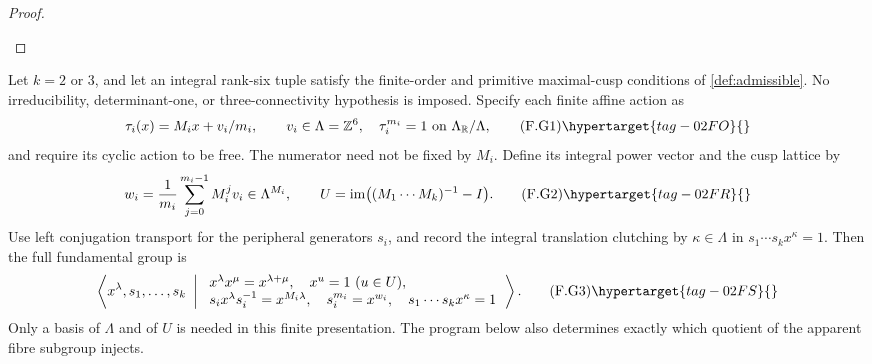 \begin{proof}
\begin{enumerate}[label={$\langle1\rangle$\arabic*.}]
\end{enumerate}
\end{proof}




\begin{theorem}\hypertarget{tag-02NM}{}\label{maps:src:F.2.31}


Let $k=2$ or $3$, and let an integral rank-six tuple satisfy the
finite-order and primitive maximal-cusp conditions of \cref{def:admissible}.  No
irreducibility, determinant-one, or three-connectivity hypothesis is
imposed.  Specify each finite affine action as
\[
 \tau_i(x)=M_ix+v_i/m_i,\qquad v_i\in\Lambda=\mathbb Z^6,
 \quad \tau_i^{m_i}=1\text{ on }\Lambda_{\mathbb R}/\Lambda,
 \tag{F.G1}\hypertarget{tag-02FO}{}\label{maps:eq:F.G1}
\]
and require its cyclic action to be free.  The numerator need not be
fixed by $M_i$.  Define its integral power vector and the cusp
lattice by
\[
 w_i=\frac1{m_i}\sum_{j=0}^{m_i-1}M_i^jv_i\in\Lambda^{M_i},
 \qquad U=\operatorname{im}\bigl((M_1\cdots M_k)^{-1}-I\bigr).
 \tag{F.G2}\hypertarget{tag-02FR}{}\label{maps:eq:F.G2}
\]
Use left conjugation transport for the peripheral generators $s_i$,
and record the integral translation clutching by $\kappa\in\Lambda$
in $s_1\cdots s_kx^\kappa=1$.  Then the full fundamental group is
\[
 \left\langle x^\lambda,s_1,\ldots,s_k\ \left|\
 \begin{array}{l}
 x^\lambda x^\mu=x^{\lambda+\mu},\quad x^u=1\ (u\in U),\\
 s_ix^\lambda s_i^{-1}=x^{M_i\lambda},\quad
 s_i^{m_i}=x^{w_i},\quad s_1\cdots s_kx^\kappa=1
 \end{array}\right.\right\rangle .                         \tag{F.G3}\hypertarget{tag-02FS}{}\label{maps:eq:F.G3}
\]
Only a basis of $\Lambda$ and of $U$ is needed in this finite
presentation.  The program below also determines exactly which
quotient of the apparent fibre subgroup injects.


\end{theorem}
